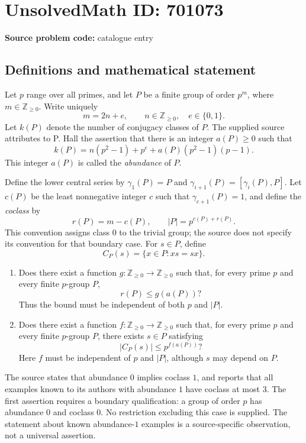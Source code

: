 \documentclass[11pt]{article}
\newcommand{\Z}{\mathbb{Z}}
\begin{document}
\section*{UnsolvedMath ID: 701073}
\textbf{Source problem code:} catalogue entry
\subsection{Definitions and mathematical statement}
Let \(p\) range over all primes, and let \(P\) be a finite group of order \(p^m\), where \(m\in\Z_{\geq 0}\). Write uniquely
\[
m=2n+e,\qquad n\in\Z_{\geq 0},\quad e\in\{0,1\}.
\]
Let \(k(P)\) denote the number of conjugacy classes of \(P\). The supplied source attributes to P. Hall the assertion that there is an integer \(a(P)\geq 0\) such that
\[
k(P)=n(p^2-1)+p^e+a(P)(p^2-1)(p-1).
\]
This integer \(a(P)\) is called the \emph{abundance} of \(P\).

Define the lower central series by \(\gamma_1(P)=P\) and \(\gamma_{i+1}(P)=[\gamma_i(P),P]\). Let \(c(P)\) be the least nonnegative integer \(c\) such that \(\gamma_{c+1}(P)=1\), and define the \emph{coclass} by
\[
r(P)=m-c(P),\qquad |P|=p^{c(P)+r(P)}.
\]
This convention assigns class \(0\) to the trivial group; the source does not specify its convention for that boundary case. For \(s\in P\), define
\[
C_P(s)=\{x\in P:xs=sx\}.
\]

\begin{enumerate}
\item[(a)] Does there exist a function \(g:\Z_{\geq 0}\to\Z_{\geq 0}\) such that, for every prime \(p\) and every finite \(p\)-group \(P\),
\[
r(P)\leq g(a(P))?
\]
Thus the bound must be independent of both \(p\) and \(|P|\).
\item[(b)] Does there exist a function \(f:\Z_{\geq 0}\to\Z_{\geq 0}\) such that, for every prime \(p\) and every finite \(p\)-group \(P\), there exists \(s\in P\) satisfying
\[
|C_P(s)|\leq p^{f(a(P))}?
\]
Here \(f\) must be independent of \(p\) and \(|P|\), although \(s\) may depend on \(P\).
\end{enumerate}

The source states that abundance \(0\) implies coclass \(1\), and reports that all examples known to its authors with abundance \(1\) have coclass at most \(3\). The first assertion requires a boundary qualification: a group of order \(p\) has abundance \(0\) and coclass \(0\). No restriction excluding this case is supplied. The statement about known abundance-\(1\) examples is a source-specific observation, not a universal assertion.
\end{document}
